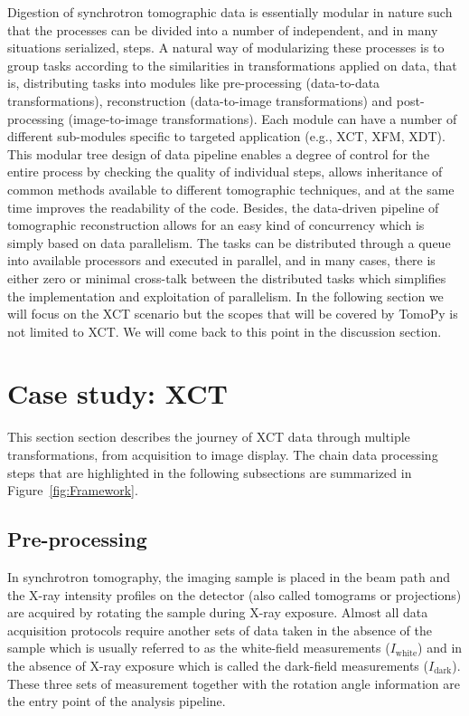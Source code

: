 \documentclass[pdf]{iucr}              %
\begin{document}
Digestion of synchrotron tomographic data is essentially modular in nature such that the processes can be divided into a number of independent, and in many situations serialized, steps. A natural way of modularizing these processes is to group tasks according to the similarities in transformations applied on data, that is, distributing tasks into modules like pre-processing (data-to-data transformations), reconstruction (data-to-image transformations) and post-processing (image-to-image transformations). Each module can have a number of different sub-modules specific to targeted application (e.g., XCT, XFM, XDT). This  modular tree design of data pipeline enables a degree of control for the entire process by checking the quality of individual steps, allows inheritance of common methods available to different tomographic techniques, and at the same time improves the readability of the code. Besides, the data-driven pipeline of tomographic reconstruction allows for an easy kind of concurrency which is simply based on data parallelism. The tasks can be distributed through a queue into available processors and executed in parallel, and in many cases, there is either zero or minimal cross-talk between the distributed tasks which simplifies the implementation and exploitation of parallelism. In the following section we will focus on the XCT scenario but the scopes that will be covered by TomoPy is not limited to XCT. We will come back to this point in the discussion section.

\section{Case study: XCT} 

This section section describes the journey of XCT data through multiple transformations, from acquisition to image display. The chain data processing steps that are highlighted in the following subsections are summarized in Figure~\ref{fig:Framework}. 

\subsection{Pre-processing} 

In synchrotron tomography, the imaging sample is placed in the beam path and the X-ray intensity profiles on the detector (also called tomograms or projections) are acquired by rotating the sample during X-ray exposure. Almost all data acquisition protocols require another sets of data taken in the absence of the sample which is usually referred to as the white-field measurements ($I_{\mbox{white}}$) and in the absence of X-ray exposure which is called the dark-field measurements ($I_{\mbox{dark}}$). These three sets of measurement together with the rotation angle information are the entry point of the analysis pipeline.
\end{document}
